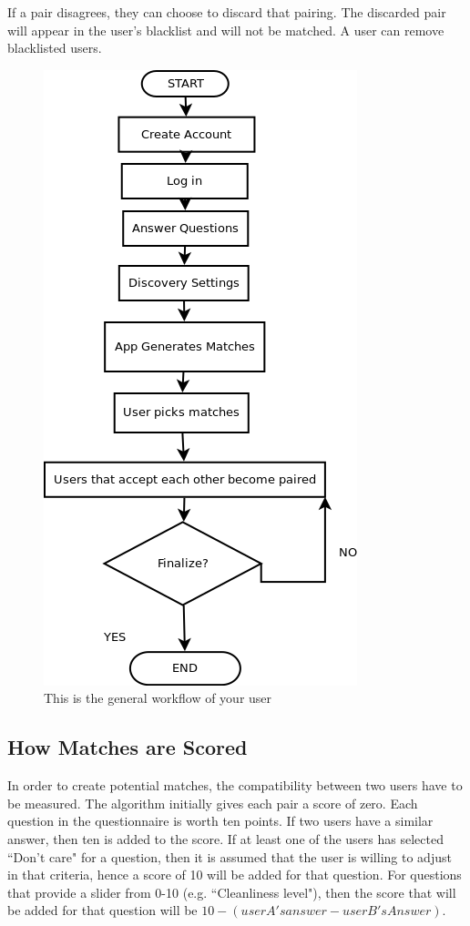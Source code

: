 \documentclass[journal]{./IEEE/IEEEtran}
\begin{document}
If a pair disagrees, they can choose to discard that pairing. The discarded pair will appear in the user's blacklist and will not be matched. A user can remove blacklisted users.

\begin{figure}[h]
\centering
\includegraphics[scale=0.5]{Workflow}
\caption{This is the general workflow of your user}
\end{figure}

\subsection{How Matches are Scored}
In order to create potential matches, the compatibility between two users have to be measured. The algorithm initially gives each pair a score of zero. Each question in the questionnaire is worth ten points. If two users have a similar answer, then ten is added to the score. If at least one of the users has selected ``Don't care" for a question, then it is assumed that the user is willing to adjust in that criteria, hence a score of 10 will be added for that question. For questions that provide a slider from 0-10 (e.g. ``Cleanliness level"), then the score that will be added for that question will be $10 - (user A's answer - user B's Answer)$.
\end{document}
